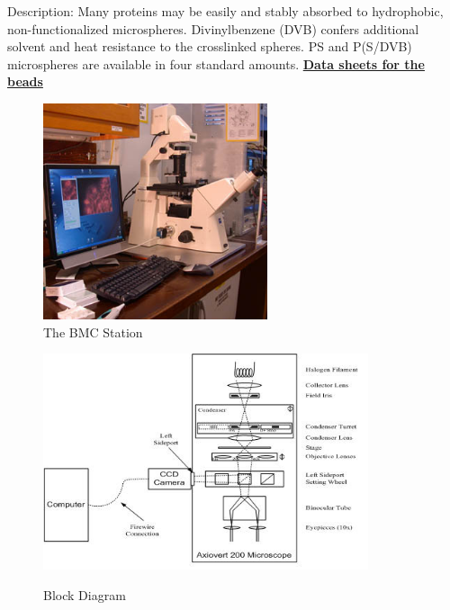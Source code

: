 \documentclass{../lab}
\begin{document}
Description: Many proteins may be easily and stably absorbed to hydrophobic, non-functionalized microspheres. Divinylbenzene (DVB) confers additional solvent and heat resistance to the crosslinked spheres. PS and P(S/DVB) microspheres are available in four standard amounts. \href{http://physics111.lib.berkeley.edu/Physics111/Reprints/BMC/Colloid\%20Data\%20Sheets.pdf}{\textbf{Data sheets for the beads}} \\

\begin{figure}[h]
\begin{minipage}{.40\linewidth}
    \href{http://experimentationlab.berkeley.edu/sites/default/files/images/BMC_Station319.jpg}{\includegraphics[height=180pt,keepaspectratio]{images/BMC_Station319.jpg}} \\
    \caption{The BMC Station}
\end{minipage}\hfill
\begin{minipage}{.59\linewidth}
    \href{http://experimentationlab.berkeley.edu/sites/default/files/images/Setup2.jpg}{\includegraphics[height=180pt,keepaspectratio]{images/Setup2.jpg}} \\
    \caption{Block Diagram}
\end{minipage}
\end{figure}
\end{document}
